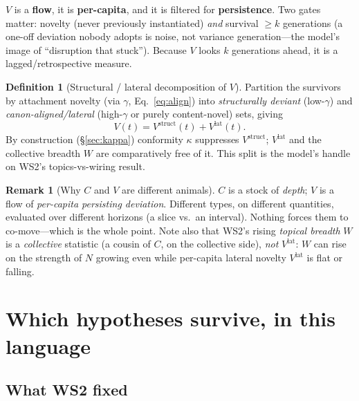 \documentclass[11pt,letterpaper]{article}
\theoremstyle{definition}
\newtheorem{definition}{Definition}[section]
\newtheorem{remark}{Remark}[section]
\theoremstyle{plain}
\begin{document}
$V$ is a \textbf{flow}, it is \textbf{per-capita}, and it is filtered for
\textbf{persistence}. Two gates matter: novelty (never previously instantiated)
\emph{and} survival $\ge k$ generations (a one-off deviation nobody adopts is
noise, not variance generation---the model's image of ``disruption that stuck'').
Because $V$ looks $k$ generations ahead, it is a lagged/retrospective measure.

\begin{definition}[Structural / lateral decomposition of $V$]\label{def:Vsplit}
Partition the survivors by attachment novelty (via $\gamma$,
Eq.~\eqref{eq:align}) into \emph{structurally deviant} (low-$\gamma$) and
\emph{canon-aligned/lateral} (high-$\gamma$ or purely content-novel) sets, giving
\begin{equation}
  V(t) = V^{\mathrm{struct}}(t) + V^{\mathrm{lat}}(t).
\end{equation}
By construction (\S\ref{sec:kappa}) conformity $\kappa$ suppresses
$V^{\mathrm{struct}}$; $V^{\mathrm{lat}}$ and the collective breadth $W$ are
comparatively free of it. This split is the model's handle on WS2's
topics-vs-wiring result.
\end{definition}

\begin{remark}[Why $C$ and $V$ are different animals]
$C$ is a stock of \emph{depth}; $V$ is a flow of \emph{per-capita persisting
deviation}. Different types, on different quantities, evaluated over different
horizons (a slice vs.\ an interval). Nothing forces them to co-move---which is the
whole point. Note also that WS2's rising \emph{topical breadth} $W$ is a
\emph{collective} statistic (a cousin of $C$, on the collective side), \emph{not}
$V^{\mathrm{lat}}$: $W$ can rise on the strength of $N$ growing even while
per-capita lateral novelty $V^{\mathrm{lat}}$ is flat or falling.
\end{remark}

\section{Which hypotheses survive, in this language}\label{sec:hypotheses}

\subsection{What WS2 fixed}
\end{document}
